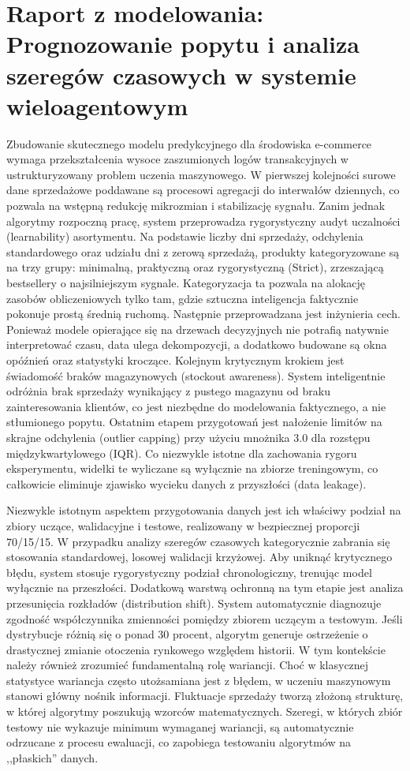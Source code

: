 \documentclass[12pt,a4paper]{article}
\begin{document}
\section*{Raport z modelowania: Prognozowanie popytu i analiza szeregów czasowych w systemie wieloagentowym}

Zbudowanie skutecznego modelu predykcyjnego dla środowiska e-commerce wymaga przekształcenia wysoce zaszumionych logów transakcyjnych w ustrukturyzowany problem uczenia maszynowego. W pierwszej kolejności surowe dane sprzedażowe poddawane są procesowi agregacji do interwałów dziennych, co pozwala na wstępną redukcję mikrozmian i stabilizację sygnału. Zanim jednak algorytmy rozpoczną pracę, system przeprowadza rygorystyczny audyt uczalności (learnability) asortymentu. Na podstawie liczby dni sprzedaży, odchylenia standardowego oraz udziału dni z zerową sprzedażą, produkty kategoryzowane są na trzy grupy: minimalną, praktyczną oraz rygorystyczną (Strict), zrzeszającą bestsellery o najsilniejszym sygnale. Kategoryzacja ta pozwala na alokację zasobów obliczeniowych tylko tam, gdzie sztuczna inteligencja faktycznie pokonuje prostą średnią ruchomą. Następnie przeprowadzana jest inżynieria cech. Ponieważ modele opierające się na drzewach decyzyjnych nie potrafią natywnie interpretować czasu, data ulega dekompozycji, a dodatkowo budowane są okna opóźnień oraz statystyki kroczące. Kolejnym krytycznym krokiem jest świadomość braków magazynowych (stockout awareness). System inteligentnie odróżnia brak sprzedaży wynikający z pustego magazynu od braku zainteresowania klientów, co jest niezbędne do modelowania faktycznego, a nie stłumionego popytu. Ostatnim etapem przygotowań jest nałożenie limitów na skrajne odchylenia (outlier capping) przy użyciu mnożnika 3.0 dla rozstępu międzykwartylowego (IQR). Co niezwykle istotne dla zachowania rygoru eksperymentu, widełki te wyliczane są wyłącznie na zbiorze treningowym, co całkowicie eliminuje zjawisko wycieku danych z przyszłości (data leakage).

Niezwykle istotnym aspektem przygotowania danych jest ich właściwy podział na zbiory uczące, walidacyjne i testowe, realizowany w bezpiecznej proporcji 70/15/15. W przypadku analizy szeregów czasowych kategorycznie zabrania się stosowania standardowej, losowej walidacji krzyżowej. Aby uniknąć krytycznego błędu, system stosuje rygorystyczny podział chronologiczny, trenując model wyłącznie na przeszłości. Dodatkową warstwą ochronną na tym etapie jest analiza przesunięcia rozkładów (distribution shift). System automatycznie diagnozuje zgodność współczynnika zmienności pomiędzy zbiorem uczącym a testowym. Jeśli dystrybucje różnią się o ponad 30 procent, algorytm generuje ostrzeżenie o drastycznej zmianie otoczenia rynkowego względem historii. W tym kontekście należy również zrozumieć fundamentalną rolę wariancji. Choć w klasycznej statystyce wariancja często utożsamiana jest z błędem, w uczeniu maszynowym stanowi główny nośnik informacji. Fluktuacje sprzedaży tworzą złożoną strukturę, w której algorytmy poszukują wzorców matematycznych. Szeregi, w których zbiór testowy nie wykazuje minimum wymaganej wariancji, są automatycznie odrzucane z procesu ewaluacji, co zapobiega testowaniu algorytmów na ,,płaskich'' danych.
\end{document}
